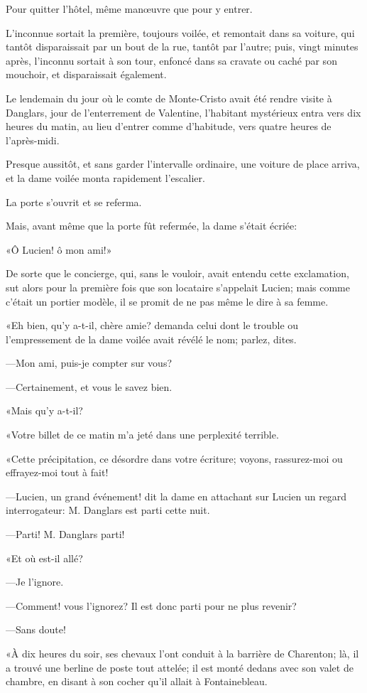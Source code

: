 Pour quitter l'hôtel, même manœuvre que pour y entrer. 

L'inconnue sortait la première, toujours voilée, et remontait dans sa voiture, qui tantôt disparaissait par un bout de la rue, tantôt par l'autre; puis, vingt minutes après, l'inconnu sortait à son tour, enfoncé dans sa cravate ou caché par son mouchoir, et disparaissait également. 

Le lendemain du jour où le comte de Monte-Cristo avait été rendre visite à Danglars, jour de l'enterrement de Valentine, l'habitant mystérieux entra vers dix heures du matin, au lieu d'entrer comme d'habitude, vers quatre heures de l'après-midi. 

Presque aussitôt, et sans garder l'intervalle ordinaire, une voiture de place arriva, et la dame voilée monta rapidement l'escalier. 

La porte s'ouvrit et se referma. 

Mais, avant même que la porte fût refermée, la dame s'était écriée: 

«Ô Lucien! ô mon ami!» 

De sorte que le concierge, qui, sans le vouloir, avait entendu cette exclamation, sut alors pour la première fois que son locataire s'appelait Lucien; mais comme c'était un portier modèle, il se promit de ne pas même le dire à sa femme. 

«Eh bien, qu'y a-t-il, chère amie? demanda celui dont le trouble ou l'empressement de la dame voilée avait révélé le nom; parlez, dites. 

—Mon ami, puis-je compter sur vous? 

—Certainement, et vous le savez bien. 

«Mais qu'y a-t-il? 

«Votre billet de ce matin m'a jeté dans une perplexité terrible. 

«Cette précipitation, ce désordre dans votre écriture; voyons, rassurez-moi ou effrayez-moi tout à fait! 

—Lucien, un grand événement! dit la dame en attachant sur Lucien un regard interrogateur: M. Danglars est parti cette nuit. 

—Parti! M. Danglars parti! 

«Et où est-il allé? 

—Je l'ignore. 

—Comment! vous l'ignorez? Il est donc parti pour ne plus revenir? 

—Sans doute! 

«À dix heures du soir, ses chevaux l'ont conduit à la barrière de Charenton; là, il a trouvé une berline de poste tout attelée; il est monté dedans avec son valet de chambre, en disant à son cocher qu'il allait à Fontainebleau. 

